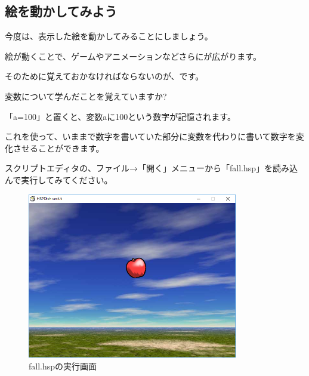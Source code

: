 \newpage
\subsection{絵を動かしてみよう}



今度は、表示した絵を動かしてみることにしましょう。

絵が動くことで、ゲームやアニメーションなどさらにが広がります。

そのために覚えておかなければならないのが、です。


変数について学んだことを覚えていますか?


\begin{description}
    \item {}
    \item {}
    \item {}
    \item {}
\end{description}

「a=100」と置くと、変数aに100という数字が記憶されます。

これを使って、いままで数字を書いていた部分に変数を代わりに書いて数字を変化させることができます。

スクリプトエディタの、ファイル→「開く」メニューから「fall.hsp」を読み込んで実行してみてください。



\begin{figure}[H]
    \begin{center}
      \includegraphics[keepaspectratio,width=9.183cm,height=7.241cm]{text04-img/text04-img019.png}
      \caption{fall.hspの実行画面}
    \end{center}
    \label{fig:prog_menu}
\end{figure}

